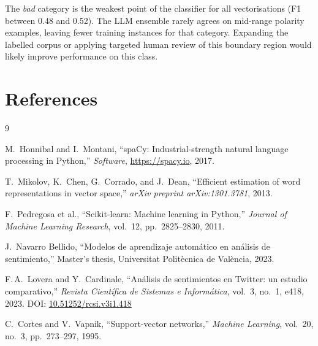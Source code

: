 \documentclass[12pt, letterpaper]{article}
\begin{document}
The \textit{bad} category is the weakest point of the classifier for all
vectorisations (F1 between 0.48 and 0.52). The LLM ensemble rarely agrees on
mid-range polarity examples, leaving fewer training instances for that
category. Expanding the labelled corpus or applying targeted human review of
this boundary region would likely improve performance on this class.

\section*{References}

\begin{thebibliography}{9}

  M.\ Honnibal and I.\ Montani,
  ``spaCy: Industrial-strength natural language processing in Python,''
  \textit{Software}, \url{https://spacy.io}, 2017.

  T.\ Mikolov, K.\ Chen, G.\ Corrado, and J.\ Dean,
  ``Efficient estimation of word representations in vector space,''
  \textit{arXiv preprint arXiv:1301.3781}, 2013.

  F.\ Pedregosa et al.,
  ``Scikit-learn: Machine learning in Python,''
  \textit{Journal of Machine Learning Research}, vol.~12,
  pp.~2825--2830, 2011.

  J.\ Navarro Bellido,
  ``Modelos de aprendizaje automático en análisis de sentimiento,''
  Master's thesis, Universitat Politècnica de València, 2023.

  F.\,A.\ Lovera and Y.\ Cardinale,
  ``Análisis de sentimientos en Twitter: un estudio comparativo,''
  \textit{Revista Científica de Sistemas e Informática}, vol.~3, no.~1,
  e418, 2023.
  DOI: \href{https://doi.org/10.51252/rcsi.v3i1.418}{10.51252/rcsi.v3i1.418}

  C.\ Cortes and V.\ Vapnik,
  ``Support-vector networks,''
  \textit{Machine Learning}, vol.~20, no.~3, pp.~273--297, 1995.

\end{thebibliography}
\end{document}
